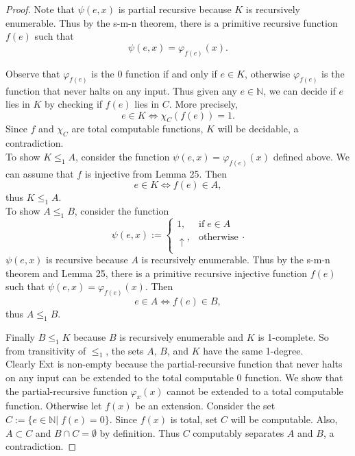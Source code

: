 \documentclass{article}
\begin{document}
\begin{enumerate}[label={\bf Q\arabic*:}]
\begin{proof}
      Note that $\psi(e,x)$ is partial recursive because $K$ is recursively
      enumerable. Thus by the s-m-n theorem, there is a primitive recursive
      function $f(e)$ such that
      \[\psi(e,x)=\varphi_{f(e)}(x).\]

      Observe that $\varphi_{f(e)}$ is the 0 function if and only if $e\in
      K$, otherwise $\varphi_{f(e)}$ is the function that never halts on
      any input. Thus given any $e\in\mathbb{N}$, we can decide if $e$ lies
      in $K$ by checking if $f(e)$ lies in $C$. More precisely,
      \[e\in K \Leftrightarrow \chi_C(f(e))=1.\]
      Since $f$ and $\chi_C$ are total computable functions, $K$ will be
      decidable, a contradiction. \\

      To show $K\leq_1A$, consider the function
      $\psi(e,x)=\varphi_{f(e)}(x)$ defined above. We can assume that $f$
      is injective from Lemma 25. Then
      \[e\in K \Leftrightarrow f(e)\in A,\]
      thus $K\leq_1A$. \\

      To show $A\leq_1B$, consider the function
      \begin{equation*}
        \psi(e,x) :=
        \begin{cases}
          1, &\text{if}\; e\in A\\
          \uparrow, &\text{otherwise}\\
        \end{cases}.
      \end{equation*}
      $\psi(e,x)$ is recursive because $A$ is recursively enumerable. Thus
      by the s-m-n theorem and Lemma 25, there is a primitive recursive
      injective function $f(e)$ such that $\psi(e,x)=\varphi_{f(e)}(x)$.
      Then
      \[e\in A \Leftrightarrow f(e)\in B,\]
      thus $A\leq_1B$.

      Finally $B\leq_1K$ because $B$ is recursively enumerable and $K$ is
      1-complete. So from transitivity of $\leq_1$, the sets $A$, $B$, and
      $K$ have the same 1-degree. \\

      Clearly $\text{Ext}$ is non-empty because the partial-recursive
      function that never halts on any input can be extended to the
      total computable 0 function. We show that the partial-recursive
      function $\varphi_x(x)$ cannot be extended to a total computable
      function. Otherwise let $f(x)$ be an extension. Consider the set
      $C:=\{e\in\mathbb{N}|\; f(e)=0\}$. Since $f(x)$ is total, set $C$
      will be computable. Also, $A\subset C$ and $B\cap C=\emptyset$ by
      definition. Thus $C$ computably separates $A$ and $B$, a
      contradiction.
    \end{proof}


\end{enumerate}
\end{document}

